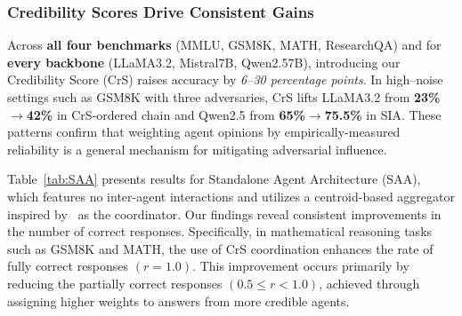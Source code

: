 \subsubsection{Credibility Scores Drive Consistent Gains}
Across \textbf{all four benchmarks} (MMLU, GSM8K, MATH, ResearchQA) and for \textbf{every backbone} (LLaMA3.2, Mistral7B, Qwen2.57B), introducing our Credibility Score (CrS) raises accuracy by \emph{6--30 percentage points}. In high--noise settings such as GSM8K with three adversaries, CrS lifts LLaMA3.2 from \textbf{23\%$\rightarrow$42\%} in CrS-ordered chain and Qwen2.5 from \textbf{65\%$\rightarrow$75.5\%} in SIA. These patterns confirm that weighting agent opinions by empirically-measured reliability is a general mechanism for mitigating adversarial influence. 

Table~\ref{tab:SAA} presents results for Standalone Agent Architecture (SAA), which features no inter-agent interactions and utilizes a centroid-based aggregator inspired by~\cite{requal} as the coordinator. Our findings reveal consistent improvements in the number of correct responses. Specifically, in mathematical reasoning tasks such as GSM8K and MATH, the use of CrS coordination enhances the rate of fully correct responses $(r=1.0)$. This improvement occurs primarily by reducing the partially correct responses $(0.5 \leq r < 1.0)$, achieved through assigning higher weights to answers from more credible agents.

